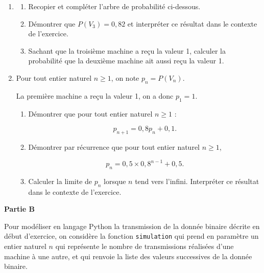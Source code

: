 \documentclass[10pt]{article}
\begin{document}
\begin{enumerate}
\item 
	\begin{enumerate}
		\item Recopier et compléter l'arbre de probabilité ci-dessous.

\medskip

\begin{center}
{
	{ \taput{\ldots}
	 \tbput{\ldots}
	}
	{ \taput{\ldots}
	 \tbput{\ldots}
	}
}
\end{center}

		\item Démontrer que $P(V_3) = 0,82$ et interpréter ce résultat dans le contexte de l'exercice.
		\item Sachant que la troisième machine a reçu la valeur 1, calculer la probabilité que la deuxième machine ait aussi reçu la valeur 1.
	\end{enumerate}
\item Pour tout entier naturel $n \geqslant 1$, on note $p_n = P(V_n)$.

La première machine a reçu la valeur 1, on a donc $p_1 = 1$.
	\begin{enumerate}
		\item Démontrer que pour tout entier naturel $n \geqslant 1$ :
		
\[p_{n+1} = 0,8p_n + 0,1.\]

		\item Démontrer par récurrence que pour tout entier naturel $n \geqslant 1$,

\[p_n = 0,5 \times 0,8^{n-1} + 0,5.\]

		\item Calculer la limite de $p_n$ lorsque $n$ tend vers l'infini. Interpréter ce résultat dans le contexte de l'exercice.
	\end{enumerate}
\end{enumerate}


\textbf{Partie B}

\medskip

Pour modéliser en langage Python la transmission de la donnée binaire décrite en début d'exercice, on considère la fonction \texttt{simulation} qui prend en paramètre un entier naturel $n$ qui représente le nombre de transmissions réalisées d'une machine à une autre, et qui renvoie la liste des valeurs successives de la donnée binaire.
\end{document}
